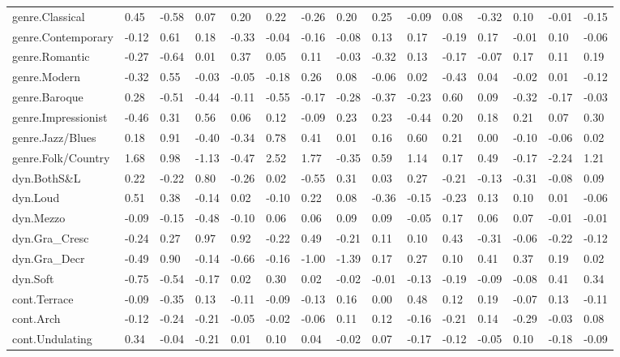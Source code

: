 \documentclass[
]{article}
\newenvironment{lltable}{\begin{landscape}\begin{center}\begin{ThreePartTable}}{\end{ThreePartTable}\end{center}\end{landscape}}
\begin{document}
\begin{lltable}
{\begin{longtable}{lllllllllllllll}
genre.Classical & 0.45 & -0.58 & 0.07 & 0.20 & 0.22 & -0.26 & 0.20 & 0.25 & -0.09 & 0.08 & -0.32 & 0.10 & -0.01 & -0.15\\
genre.Contemporary & -0.12 & 0.61 & 0.18 & -0.33 & -0.04 & -0.16 & -0.08 & 0.13 & 0.17 & -0.19 & 0.17 & -0.01 & 0.10 & -0.06\\
genre.Romantic & -0.27 & -0.64 & 0.01 & 0.37 & 0.05 & 0.11 & -0.03 & -0.32 & 0.13 & -0.17 & -0.07 & 0.17 & 0.11 & 0.19\\
genre.Modern & -0.32 & 0.55 & -0.03 & -0.05 & -0.18 & 0.26 & 0.08 & -0.06 & 0.02 & -0.43 & 0.04 & -0.02 & 0.01 & -0.12\\
genre.Baroque & 0.28 & -0.51 & -0.44 & -0.11 & -0.55 & -0.17 & -0.28 & -0.37 & -0.23 & 0.60 & 0.09 & -0.32 & -0.17 & -0.03\\
genre.Impressionist & -0.46 & 0.31 & 0.56 & 0.06 & 0.12 & -0.09 & 0.23 & 0.23 & -0.44 & 0.20 & 0.18 & 0.21 & 0.07 & 0.30\\
genre.Jazz/Blues & 0.18 & 0.91 & -0.40 & -0.34 & 0.78 & 0.41 & 0.01 & 0.16 & 0.60 & 0.21 & 0.00 & -0.10 & -0.06 & 0.02\\
genre.Folk/Country & 1.68 & 0.98 & -1.13 & -0.47 & 2.52 & 1.77 & -0.35 & 0.59 & 1.14 & 0.17 & 0.49 & -0.17 & -2.24 & 1.21\\
dyn.BothS\&L & 0.22 & -0.22 & 0.80 & -0.26 & 0.02 & -0.55 & 0.31 & 0.03 & 0.27 & -0.21 & -0.13 & -0.31 & -0.08 & 0.09\\
dyn.Loud & 0.51 & 0.38 & -0.14 & 0.02 & -0.10 & 0.22 & 0.08 & -0.36 & -0.15 & -0.23 & 0.13 & 0.10 & 0.01 & -0.06\\
dyn.Mezzo & -0.09 & -0.15 & -0.48 & -0.10 & 0.06 & 0.06 & 0.09 & 0.09 & -0.05 & 0.17 & 0.06 & 0.07 & -0.01 & -0.01\\
dyn.Gra\_Cresc & -0.24 & 0.27 & 0.97 & 0.92 & -0.22 & 0.49 & -0.21 & 0.11 & 0.10 & 0.43 & -0.31 & -0.06 & -0.22 & -0.12\\
dyn.Gra\_Decr & -0.49 & 0.90 & -0.14 & -0.66 & -0.16 & -1.00 & -1.39 & 0.17 & 0.27 & 0.10 & 0.41 & 0.37 & 0.19 & 0.02\\
dyn.Soft & -0.75 & -0.54 & -0.17 & 0.02 & 0.30 & 0.02 & -0.02 & -0.01 & -0.13 & -0.19 & -0.09 & -0.08 & 0.41 & 0.34\\
cont.Terrace & -0.09 & -0.35 & 0.13 & -0.11 & -0.09 & -0.13 & 0.16 & 0.00 & 0.48 & 0.12 & 0.19 & -0.07 & 0.13 & -0.11\\
cont.Arch & -0.12 & -0.24 & -0.21 & -0.05 & -0.02 & -0.06 & 0.11 & 0.12 & -0.16 & -0.21 & 0.14 & -0.29 & -0.03 & 0.08\\
cont.Undulating & 0.34 & -0.04 & -0.21 & 0.01 & 0.10 & 0.04 & -0.02 & 0.07 & -0.17 & -0.12 & -0.05 & 0.10 & -0.18 & -0.09\\

\end{longtable}}
\end{lltable}
\end{document}
